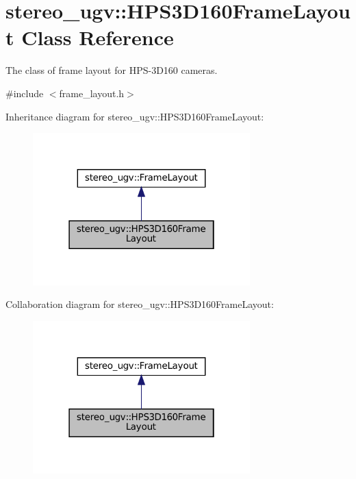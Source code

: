 \hypertarget{classstereo__ugv_1_1HPS3D160FrameLayout}{}\section{stereo\+\_\+ugv\+:\+:H\+P\+S3\+D160\+Frame\+Layout Class Reference}
\label{classstereo__ugv_1_1HPS3D160FrameLayout}


The class of frame layout for H\+P\+S-\/3\+D160 cameras.  




{\ttfamily \#include $<$frame\+\_\+layout.\+h$>$}



Inheritance diagram for stereo\+\_\+ugv\+:\+:H\+P\+S3\+D160\+Frame\+Layout\+:
\nopagebreak
\begin{figure}[H]
\begin{center}
\leavevmode
\includegraphics[width=238pt]{classstereo__ugv_1_1HPS3D160FrameLayout__inherit__graph}
\end{center}
\end{figure}


Collaboration diagram for stereo\+\_\+ugv\+:\+:H\+P\+S3\+D160\+Frame\+Layout\+:
\nopagebreak
\begin{figure}[H]
\begin{center}
\leavevmode
\includegraphics[width=238pt]{classstereo__ugv_1_1HPS3D160FrameLayout__coll__graph}
\end{center}
\end{figure}
